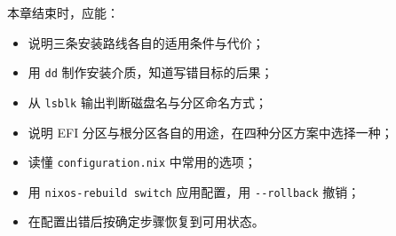 \begin{checkpoint}
本章结束时，应能：
\begin{itemize}
  \item 说明三条安装路线各自的适用条件与代价；
  \item 用 \texttt{dd} 制作安装介质，知道写错目标的后果；
  \item 从 \texttt{lsblk} 输出判断磁盘名与分区命名方式；
  \item 说明 EFI 分区与根分区各自的用途，在四种分区方案中选择一种；
  \item 读懂 \texttt{configuration.\allowbreak{}nix} 中常用的选项；
  \item 用 \texttt{nixos-\allowbreak{}rebuild switch} 应用配置，用 \texttt{-{}-rollback} 撤销；
  \item 在配置出错后按确定步骤恢复到可用状态。
\end{itemize}
\end{checkpoint}
